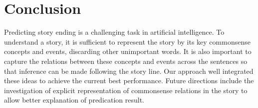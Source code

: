 \section{Conclusion}
Predicting story ending is a challenging task in artificial intelligence.
To understand a story, it is sufficient to represent the story by its key
commonsense concepts and events, discarding other unimportant words. 
It is also important to capture the relations between these concepts and
events across the sentences so that inference can be made following
the story line. Our approach well integrated these ideas to achieve the 
current best performance. Future directions include the investigation of
explicit representation of commonsense relations in the story to allow
better explanation of predication result. 
